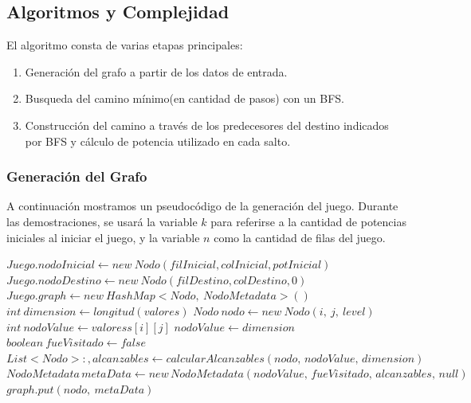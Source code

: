 \subsection{Algoritmos y Complejidad} \label{ej_3:algoritmo}
El algoritmo consta de varias etapas principales:
\begin{enumerate}
	\item Generaci\'on del grafo a partir de los datos de entrada.
	\item Busqueda del camino m\'inimo(en cantidad de pasos) con un BFS.
	\item Construcci\'on del camino a trav\'es de los predecesores del destino indicados por BFS y
 			c\'alculo de potencia utilizado en cada salto.
 \end{enumerate}

 \subsubsection{Generaci\'on del Grafo}

A continuaci\'on mostramos un pseudoc\'odigo de la generaci\'on del juego. Durante las demostraciones, se usar\'a la variable $k$ para referirse a la cantidad de potencias iniciales al iniciar el juego, y la variable $n$ como la cantidad de filas del juego.
\vspace{2mm}
\begin{algorithmic}[1]
\Statex
	\State $Juego.nodoInicial \gets new \: Nodo(filInicial, colInicial, potInicial)$
	\State $Juego.nodoDestino \gets new \: Nodo(filDestino, colDestino, 0) $
	\State $Juego.graph \gets new \: HashMap<Nodo,\: NodoMetadata>()$
	\State $int \: dimension \gets longitud(valores)$
				\State	$Nodo \: nodo\gets new \: Nodo(i,\: j,\: level)$
				\State	$int\: nodoValue \gets valoress[i][j]$
					\State $nodoValue \gets dimension$
				\EndIf
				\State	$boolean \:fueVisitado \gets false$
				\State	$List<Nodo>:, alcanzables \gets calcularAlcanzables(nodo,\, nodoValue,\, dimension)$
				\State	$NodoMetadata \, metaData \gets new\, NodoMetadata(nodoValue,\, fueVisitado,\, alcanzables,\, null)$
				\State	$graph.put(nodo,\: metaData)$
			\EndFor
		\EndFor
	\EndFor

\EndProcedure
\Statex
\end{algorithmic}
\vspace{2mm}

